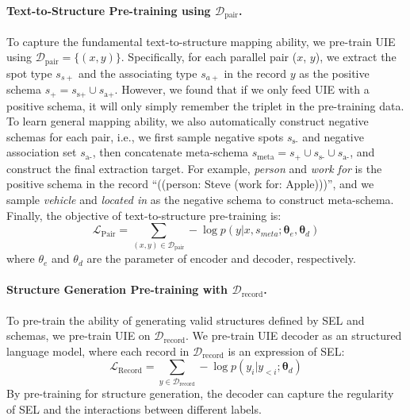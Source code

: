 \documentclass[11pt]{article}
\begin{document}
\paragraph{Text-to-Structure Pre-training using $\mathcal{D}_{\text{pair}}$.}
To capture the fundamental text-to-structure mapping ability, we pre-train UIE using $\mathcal{D}_{\text{pair}} = \{(x ,y)\}$.
Specifically, for each parallel pair ($x$, $y$), we extract the spot type $s_{s+}$ and the associating type $s_{a+}$ in the record $y$ as the positive schema $s_{+} = s_{\text{s+}} \cup s_{\text{a+}}$.
However, we found that if we only feed UIE with a positive schema, it will only simply remember the triplet in the pre-training data.
To learn general mapping ability, we also automatically construct negative schemas for each pair, i.e., we first sample negative spots $s_{\text{s-}}$ and negative association set $s_{\text{a-}}$, then concatenate meta-schema $s_{\text{meta}} = s_{+} \cup s_{\text{s-}} \cup s_{\text{a-}}$, and construct the final extraction target.
For example, \textit{person} and \textit{work for} is the positive schema in the record ``((person: Steve (work for: Apple)))'', and we sample \textit{vehicle} and \textit{located in} as the negative schema to construct meta-schema.
Finally, the objective of  text-to-structure pre-training is:
\begin{equation}  \label{equ:meta_translation_modeling}
  \mathcal{L}_{\text{Pair}} = \sum_{(x,y)\in\mathcal{D}_{\text{pair}}}
  - \log p(y|x,s_{meta};\mathbf{\theta}_{e},\mathbf{\theta}_{d})
\end{equation}
where $\theta_{e}$ and $\theta_{d}$ are the parameter of encoder and decoder, respectively.


\paragraph{Structure Generation Pre-training with $\mathcal{D}_{\text{record}}$.}

To pre-train the ability of generating valid structures defined by SEL and schemas, we pre-train UIE on $\mathcal{D}_{\text{record}}$.
We pre-train UIE decoder as an structured language model, where each record in $\mathcal{D}_{\text{record}}$ is an expression of SEL:
\begin{equation}  \label{equ:structured_language_modeling}
  \mathcal{L}_{\text{Record}} = 
    \sum_{y \in \mathcal{D}_{\text{record}}}
    - \log p(y_{i}| y_{<i}; \mathbf{\theta}_{d})
\end{equation}
By pre-training for structure generation, the decoder can capture the regularity of SEL and the interactions between different labels.
\end{document}
